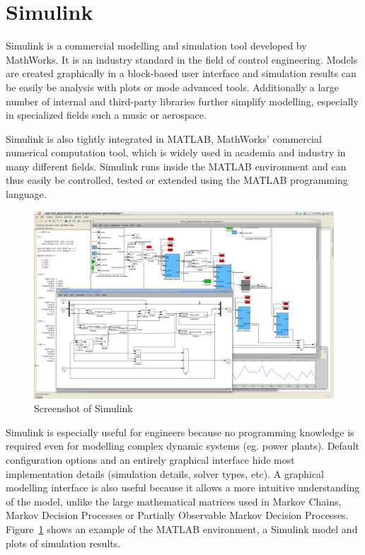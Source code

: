 \section{Simulink}
\label{sec:simulink}

Simulink is a commercial modelling and simulation tool developed by MathWorks. It is an industry standard in the field of control engineering. Models are created graphically in a block-based user interface and simulation results can be easily be analysis with plots or mode advanced tools. Additionally a large number of internal and third-party libraries further simplify modelling, especially in specialized fields such a music or aerospace.

Simulink is also tightly integrated in MATLAB, MathWorks' commercial numerical computation tool, which is widely used in academia and industry in many different fields. Simulink runs inside the MATLAB environment and can thus easily be controlled, tested or extended using the MATLAB programming language.

\begin{figure}[simulink_screenshot]
\begin{center}
\includegraphics[width=16cm]{media/simulink_screen.png}
\caption{Screenshot of Simulink}
\label{simulink_screenshot}
\end{center}
\end{figure}

Simulink is especially useful for engineers because no programming knowledge is required even for modelling complex dynamic systems (eg. power plants). Default configuration options and an entirely graphical interface hide most implementation details (simulation details, solver types, etc). A graphical modelling interface is also useful because it allows a more intuitive understanding of the model, unlike the large mathematical matrices used in Markov Chains, Markov Decision Processes or Partially Observable Markov Decision Processes. Figure~\ref{simulink_screenshot} shows an example of the MATLAB environment, a Simulink model and plots of simulation results.

